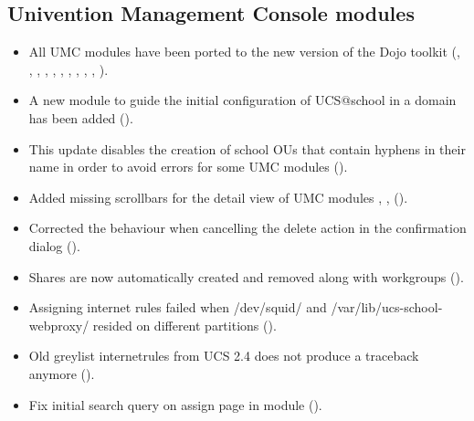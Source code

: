 \subsection{Univention Management Console modules}
\begin{itemize}

\item All UMC modules have been ported to the new version of the Dojo toolkit
  (, , ,
  , , , ,
  , , , ).

\item A new module to guide the initial configuration of UCS@school in a domain has
been added ().

\item This update disables the creation of school OUs that contain
  hyphens in their name in order to avoid errors for some UMC modules
  ().

\item Added missing scrollbars for the detail view of UMC modules
  , ,
   ().

\item Corrected the behaviour when cancelling the delete action in the confirmation dialog ().

\item Shares are now automatically created and removed along with workgroups ().

\item Assigning internet rules failed when /dev/squid/ and /var/lib/ucs-school-webproxy/ resided on different partitions ().

\item Old greylist internetrules from UCS 2.4 does not produce a traceback anymore ().

\item Fix initial search query on assign page in  module ().


\end{itemize}
